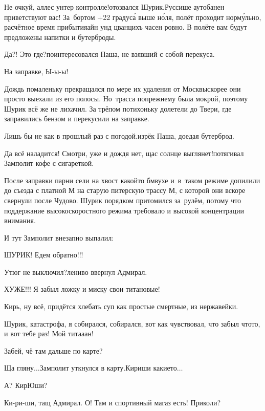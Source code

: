 \diagdash Не очкуй, аллес унтер контролле!\mdash отозвался Шурик.\mdash Руссише аутобанен приветствуют вас! За~бортом +22 градус\'{а} выше н\'{о}ля, полёт проходит норм\'{у}льно, расчётное время прибытия\mdash айн унд цванцихъ часен ровно. В полёте вам будут предложены напитки и бутерброды.

\diagdash Да?! Это где?\mdash поинтересовался Паша, не взявший с собой перекуса.

\diagdash На заправке, Ы-ы-ы!

Дождь помаленьку прекращался по мере их удаления от Москвы\mdash скорее они просто выехали из его полосы. Но~трасса по\sdash прежнему была мокрой, поэтому Шурик всё же не лихачил. За трёпом потихоньку долетели до Твери, где заправились бензом и перекусили на заправке.

\diagdash Лишь бы не как в прошлый раз с погодой.\mdash изрёк Паша, доедая бутерброд.

\diagdash Да всё наладится! Смотри, уже и дождя нет, щас солнце выглянет!\mdash потягивал Замполит кофе с сигареткой.

После заправки парни сели на хвост какой\sdash то бмв\sdash ухе и~в~таком режиме допилили до съезда с платной М на старую питерскую трассу М, с которой они вскоре свернули после Чудово. Шурик порядком притомился за~рулём, потому что поддержание высокоскоростного режима требовало и высокой концентрации внимания. 

И тут Замполит внезапно выпалил:

\diagdash ШУРИК! Едем обратно!!!

\diagdash Утюг не выключил?\mdash лениво ввернул Адмирал.

\diagdash ХУЖЕ!!! Я забыл ложку и миску свои титановые!

\diagdash Кирь, ну всё, придётся хлебать суп как простые смертные, из нержавейки.

\diagdash Шурик, катастрофа, я собирался, собирался, вот как чувствовал, что забыл что\sdash то, и вот тебе раз! Мой тита\sdash а\sdash ан!

\diagdash Забей, чё там дальше по карте?

\diagdash Ща гляну$\ldots$\mdash Замполит уткнулся в карту.\mdash Кириши какие\sdash то$\ldots$

\diagdash А? КирЮши?

\diagdash Ки-ри-ши, тащ Адмирал. О! Там и спортивный магаз есть! Приколи?


